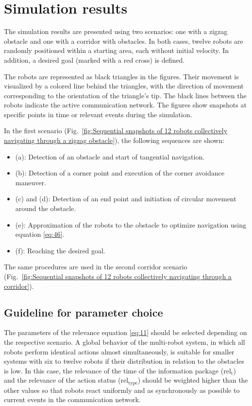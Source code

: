 \documentclass[conference]{IEEEtran}
\begin{document}
\section{Simulation results}
The simulation results are presented using two scenarios: 
one with a zigzag obstacle and one with a corridor with obstacles. 
In both cases, twelve robots are randomly 
positioned within a starting area, each without initial velocity. 
In addition, a desired goal (marked with a red cross) is defined.

The robots are represented as black triangles in the figures. 
Their movement is visualized by a colored line behind the triangles, 
with the direction of movement corresponding to the orientation of the triangle's tip. The black 
lines between the robots indicate the active communication network. 
The figures show snapshots at specific points in time or 
relevant events during the simulation.

In the first scenario (Fig.~\ref{fig:Sequential snapshots of 12 robots collectively navigating through a zigzag obstacle}), the following sequences are shown:
\begin{itemize}
\item (a): Detection of an obstacle and start of tangential navigation.
\item (b): Detection of a corner point and execution of the corner avoidance maneuver.
\item (c) and (d): Detection of an end point and initiation of circular movement around the obstacle.
\item (e): Approximation of the robots to the obstacle to optimize navigation using equation \eqref{eq:46}.
\item (f): Reaching the desired goal.
\end{itemize}

The same procedures are used in the second corridor scenario (Fig.~\ref{fig:Sequential snapshots of 12 robots collectively navigating through a corridor}).

\subsection*{Guideline for parameter choice}
The parameters of the relevance equation \eqref{eq:11} should be selected depending on the 
respective scenario. A global behavior of the 
multi-robot system, in which all robots perform identical actions almost simultaneously,
 is suitable for smaller systems with six to twelve 
robots if their distribution in relation to the obstacles 
is low. In this case, the relevance of the time of the information package 
($\mathrm{rel}_{\mathrm{t}}$) and the relevance of the action status ($\mathrm{rel}_{\mathrm{type}}$) should be weighted higher 
than the other values so that robots react uniformly and as synchronously as possible
to current events in the communication network.
\end{document}
